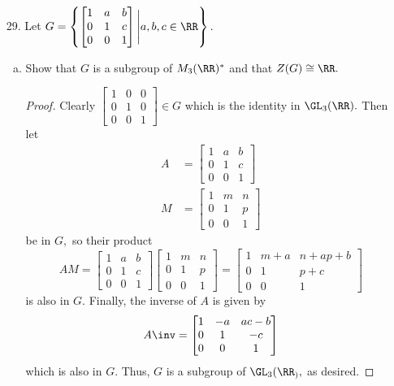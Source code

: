 \documentclass{article}
\begin{document}
\begin{itemize}
	\item[29.] Let $G=\left\{ \begin{bmatrix}
		1 & a & b \\ 0 & 1 & c \\ 0 & 0 & 1
	\end{bmatrix}\Bigg\vert a, b, c\in \RR\right\}.$ 
	\begin{enumerate}[(a)]
		\item Show that $G$ is a subgroup of $M_3(\RR)^*$ and that $Z(G)\cong \RR.$
			\begin{proof}
				Clearly $\begin{bmatrix}
					1 & 0 & 0 \\ 0 & 1 & 0 \\ 0 & 0 & 1
				\end{bmatrix}\in G$ which is the identity in $\GL_3(\RR).$ Then let
				\begin{align*}
					A &= \begin{bmatrix}
						1 & a & b \\
						0 & 1 & c \\
						0 & 0 & 1
					\end{bmatrix} \\
					M &= \begin{bmatrix}
						1 & m & n \\
						0 & 1 & p \\
						0 & 0 & 1
					\end{bmatrix}
				\end{align*} be in $G,$ so their product \[AM = \begin{bmatrix}
						1 & a & b \\
						0 & 1 & c \\
						0 & 0 & 1
					\end{bmatrix} \begin{bmatrix}
						1 & m & n \\
						0 & 1 & p \\
						0 & 0 & 1
				\end{bmatrix} = \begin{bmatrix}
				1 & m+a & n+ap+b \\
				0 & 1 & p+c \\
				0 & 0 & 1
				\end{bmatrix}\] is also in $G.$ Finally, the inverse of $A$ is given by
				\[A\inv = \begin{bmatrix}
				1 & -a & ac-b \\
				0 & 1 & -c \\
				0 & 0 & 1
				\end{bmatrix}\] which is also in $G.$ Thus, $G$ is a subgroup of $\GL_3(\RR_),$ as desired.


\end{proof}
\end{enumerate}
\end{itemize}
\end{document}
